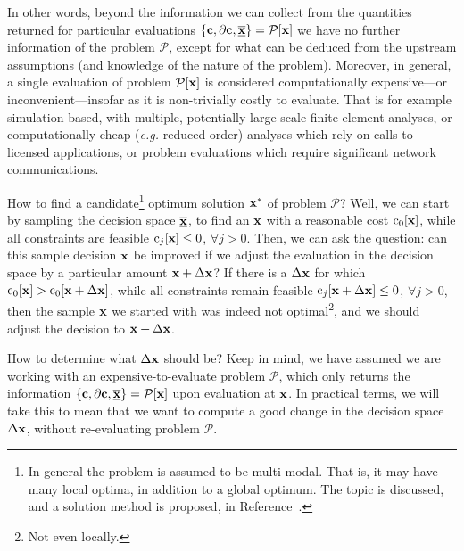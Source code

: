 \documentclass[11pt]{article}
\begin{document}
In other words, beyond the information we can collect from the quantities returned for particular evaluations $\left\{\mathbf{c}, \partial \mathbf{c}, \underline{\overline{\mathbf{x}}}\right\}=\mathcal{P}[\mathbf{x}]$ we have no further information of the problem $\mathcal{P}$, except for what can be deduced from the upstream assumptions (and knowledge of the nature of the problem). Moreover, in general, a single evaluation of problem $\mathcal{P}[\mathbf{x}]$ is considered computationally expensive---or inconvenient---insofar as it is non-trivially costly to evaluate. That is for example simulation-based, with multiple, potentially large-scale finite-element analyses, or computationally cheap (\emph{e.g.} reduced-order) analyses which rely on calls to licensed applications, or problem evaluations which require significant network communications.

How to find a candidate\footnote{In general the problem is assumed to be multi-modal. That is, it may have many local optima, in addition to a global optimum. The topic is discussed, and a solution method is proposed, in Reference~\cite{munro2022}.} optimum solution $\mathbf{x}^\ast$ of problem $\mathcal{P}$?  Well, we can start by sampling the decision space $\underline{\overline{\mathbf{x}}}$, to find an $\mathbf{x}$ with a reasonable cost $\textrm{c}_0 [\mathbf{x}]$, while all constraints are feasible $\textrm{c}_j [\mathbf{x}] \leq 0$, $\forall j > 0$. Then, we can ask the question: can this sample decision $\mathbf{x}$ be improved if we adjust the evaluation in the decision space by a particular amount $\mathbf{x} + \Delta \mathbf{x}$? If there is a $\Delta \mathbf{x}$ for which $\textrm{c}_0 [\mathbf{x}] > \textrm{c}_0 [\mathbf{x} + \Delta\mathbf{x}]$, while all constraints remain feasible $\textrm{c}_j [\mathbf{x} + \Delta \mathbf{x}] \leq 0$, $\forall j > 0$, then the sample $\mathbf{x}$ we started with was indeed not optimal\footnote{Not even locally.}, and we should adjust the decision to $\mathbf{x} + \Delta \mathbf{x}$.

How to determine what $\Delta \mathbf{x}$ should be? Keep in mind, we have assumed we are working with an expensive-to-evaluate problem $\mathcal{P}$, which only returns the information $\left\{\mathbf{c}, \partial \mathbf{c}, \underline{\overline{\mathbf{x}}}\right\}=\mathcal{P}[\mathbf{x}]$ upon evaluation at $\mathbf{x}$. In practical terms, we will take this to mean that we want to compute a good change in the decision space $\Delta \mathbf{x}$, without re-evaluating problem $\mathcal{P}$.
\end{document}
